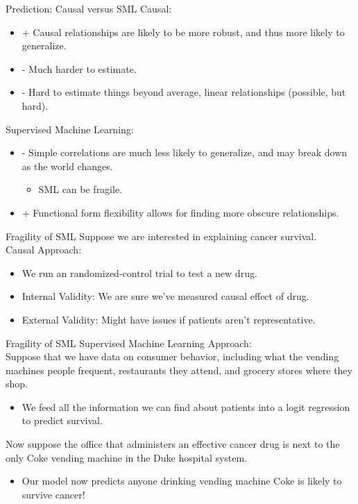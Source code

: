 \documentclass[11pt,handout]{beamer}
\begin{document}
\begin{frame}[c]{Prediction: Causal versus SML}
  Causal:
  \begin{itemize}
    \item + Causal relationships are likely to be \alert{more robust}, and thus \alert{more likely to generalize}.
    \item - Much harder to estimate.
    \item - Hard to estimate things beyond average, linear relationships (possible, but hard).
  \end{itemize}
  Supervised Machine Learning:
  \begin{itemize}
    \item - Simple correlations are \alert{much less likely to generalize}, and may break down as the world changes.
    \begin{itemize}
      \item SML can be \alert{fragile.}
    \end{itemize}
    \item + Functional form flexibility allows for finding more obscure relationships.
  \end{itemize}
\end{frame}

\begin{frame}[c]{Fragility of SML}
\pause Suppose we are interested in explaining cancer survival. \\
\vspace{0.1cm}
Causal Approach:
\begin{itemize}
    \item We run an randomized-control trial to test a new drug.
    \item Internal Validity: We are sure we've measured causal effect of drug.
    \item External Validity: Might have issues if patients aren't representative.
  \end{itemize}
\end{frame}

\begin{frame}[c]{Fragility of SML}
  Supervised Machine Learning Approach: \\
Suppose that we have data on consumer behavior, including what the vending machines people frequent, restaurants they attend, and grocery stores where they shop.
  \begin{itemize}
    \pause \item We feed all the information we can find about patients into a logit regression to predict survival.
  \end{itemize}
\pause Now suppose the office that administers an effective cancer drug is next to the only Coke vending machine in the Duke hospital system.
\begin{itemize}
  \item Our model now predicts anyone drinking vending machine Coke is likely to survive cancer!
\end{itemize}
\end{frame}
\end{document}
